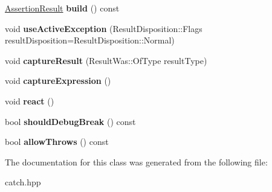 \begin{DoxyCompactItemize}
\item 
\mbox{\label{class_catch_1_1_result_builder_a4fc96e7bb8b5f7119a8e79692ec97808}} 
\hyperlink{class_catch_1_1_assertion_result}{Assertion\+Result} {\bfseries build} () const
\item 
\mbox{\label{class_catch_1_1_result_builder_a5bbd2f14a678f3e8d0f791ac6d233d65}} 
void {\bfseries use\+Active\+Exception} (Result\+Disposition\+::\+Flags result\+Disposition=Result\+Disposition\+::\+Normal)
\item 
\mbox{\label{class_catch_1_1_result_builder_a10e467f7b7a4976e5d148b4d5066e8fd}} 
void {\bfseries capture\+Result} (Result\+Was\+::\+Of\+Type result\+Type)
\item 
\mbox{\label{class_catch_1_1_result_builder_af2ae2343965802eeeb0abbd4ea9d2d36}} 
void {\bfseries capture\+Expression} ()
\item 
\mbox{\label{class_catch_1_1_result_builder_a3085cdc46533d45bed6f652a2ac295c0}} 
void {\bfseries react} ()
\item 
\mbox{\label{class_catch_1_1_result_builder_a6f2b0dbcc6cc5e0a500ac45f2534e3e7}} 
bool {\bfseries should\+Debug\+Break} () const
\item 
\mbox{\label{class_catch_1_1_result_builder_a0428fd78ab9e8e6f1aca6855f20fc715}} 
bool {\bfseries allow\+Throws} () const
\end{DoxyCompactItemize}


The documentation for this class was generated from the following file\+:\begin{DoxyCompactItemize}
\item 
catch.\+hpp\end{DoxyCompactItemize}
